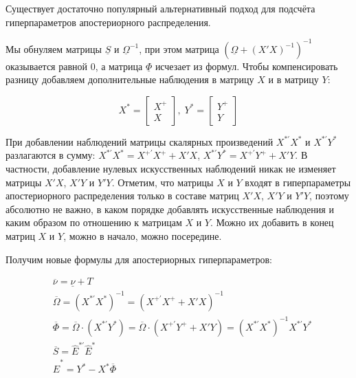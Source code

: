 \documentclass[11pt]{article} %
\newcommand{\prior}{\underline}
\newcommand{\post}{\overline}
\let\vec\relax
\DeclareMathOperator{\vec}{vec}
\begin{document}
Существует достаточно популярный альтернативный подход для подсчёта гиперпараметров апостериорного распределения.


Мы обнуляем матрицы  $\prior S$ и $\prior \Omega^{-1}$, при этом матрица $(\prior \Omega + (X'X)^{-1})^{-1}$ оказывается равной $0$, а матрица $\prior \Phi$ исчезает из формул. Чтобы компенсировать разницу добавляем дополнительные наблюдения в матрицу $X$ и в матрицу $Y$:

\[
X^*=\begin{bmatrix}
X^{+} \\
X
\end{bmatrix}, \;
Y^*=\begin{bmatrix}
Y^{+} \\
Y
\end{bmatrix}
\]



При добавлении наблюдений матрицы скалярных произведений $X^{*\prime}X^*$ и $X^{*\prime}Y^*$ разлагаются в сумму: $X^{*\prime}X^*=X^{+\prime}X^+ + X'X$, $X^{*\prime}Y^*=X^{+\prime}Y^+ + X'Y$. В частности, добавление нулевых искусственных наблюдений никак не изменяет матрицы $X'X$, $X'Y$ и $Y'Y$. Отметим, что матрицы $X$ и $Y$ входят в гиперпараметры апостериорного распределения только в составе матриц $X'X$, $X'Y$ и $Y'Y$, поэтому абсолютно не важно, в каком порядке добавлять искусственные наблюдения и каким образом по отношению к матрицам $X$ и $Y$. Можно их добавить в конец матриц $X$ и $Y$, можно в начало, можно посередине.

Получим новые формулы для апостериорных гиперпараметров:

\begin{align*}
&\post\nu =\prior \nu+T\\
&\post{\Omega}=(X^{*\prime}X^*)^{-1}=(X^{+\prime}X^+ + X'X)^{-1}\\
&\post \Phi=\post{\Omega}\cdot (X^{*\prime}Y^*)=\post{\Omega}\cdot (X^{+\prime}Y^+ + X'Y)= (X^{*\prime}X^*)^{-1}X^{*\prime}Y^*\\
&\post S=\hat E^{*\prime}\hat E^*\\
&\hat E^*=Y^*-X^*\post\Phi
\end{align*}

\end{document}

